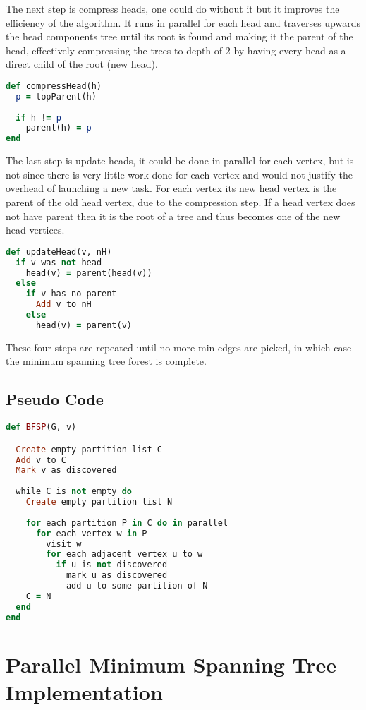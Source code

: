\documentclass{report}
\theoremstyle{plain}
\theoremstyle{definition}
\theoremstyle{remark}
\begin{document}
The next step is compress heads, one could do without it but it improves the efficiency of the algorithm. It runs in parallel for each head and traverses upwards the head components tree until its root is found and making it the parent of the head, effectively compressing the trees to depth of 2 by having every head as a direct child of the root (new head).

\begin{lstlisting}[language=Ruby]
def compressHead(h)
  p = topParent(h)  
  
  if h != p
    parent(h) = p
end
\end{lstlisting}

The last step is update heads, it could be done in parallel for each vertex, but is not since there is very little work done for each vertex and would not justify the overhead of launching a new task. For each vertex its new head vertex is the parent of the old head vertex, due to the compression step. If a head vertex does not have parent then it is the root of a tree and thus becomes one of the new head vertices.

\begin{lstlisting}[language=Ruby]
def updateHead(v, nH)
  if v was not head
    head(v) = parent(head(v))
  else
    if v has no parent
      Add v to nH
    else
      head(v) = parent(v)
\end{lstlisting}

These four steps are repeated until no more min edges are picked, in which case the minimum spanning tree forest is complete.

\subsection*{Pseudo Code} 
\begin{lstlisting}[language=Ruby]
def BFSP(G, v)

  Create empty partition list C
  Add v to C
  Mark v as discovered
  
  while C is not empty do
    Create empty partition list N
  	
    for each partition P in C do in parallel
      for each vertex w in P
        visit w
        for each adjacent vertex u to w
          if u is not discovered  	      
            mark u as discovered
            add u to some partition of N
    C = N
  end
end
\end{lstlisting}

\section{Parallel Minimum Spanning Tree Implementation}
\end{document}
